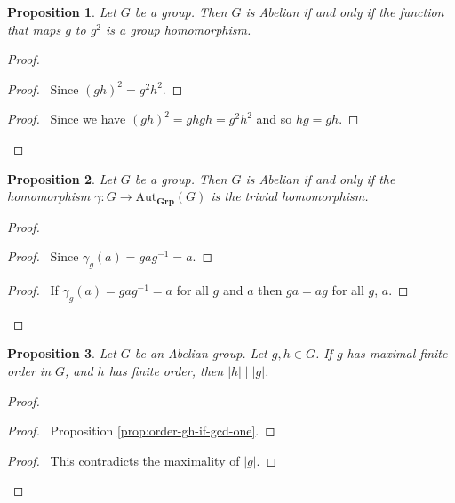 \documentclass{book}
\let\qed\relax
\newtheorem{prop}{Proposition}[chapter]
\theoremstyle{definition}
\newcommand{\Aut}[2]{\ensuremath{\mathrm{Aut}_{#1} \left( {#2} \right)}}
\newcommand{\Grp}{\ensuremath{\mathbf{Grp}}}
\newcommand{\inv}[1]{\ensuremath{{#1}^{-1}}}
\begin{document}
\begin{prop}
    Let $G$ be a group. Then $G$ is Abelian if and only if the function that maps $g$ to $g^2$ is a group homomorphism.
\end{prop}

\begin{proof}
    \pf
    \begin{proof}
        \pf\ Since $(gh)^2 = g^2h^2$.
    \end{proof}
    \begin{proof}
        \pf\ Since we have $(gh)^2 = ghgh = g^2 h^2$ and so $hg = gh$.
    \end{proof}
    \qed
\end{proof}

\begin{prop}
    Let $G$ be a group. Then $G$ is Abelian if and only if the homomorphism $\gamma : G \rightarrow \Aut{\Grp}{G}$ is the trivial homomorphism.
\end{prop}

\begin{proof}
    \pf
    \begin{proof}
        \pf\ Since $\gamma_g(a) = ga\inv{g} = a$.
    \end{proof}
    \begin{proof}
        \pf\ If $\gamma_g(a) = ga\inv{g} = a$ for all $g$ and $a$ then $ga = ag$ for all $g$, $a$.
    \end{proof}
    \qed
\end{proof}

\begin{prop}
    \label{prop:maximal-finite-order}
    Let $G$ be an Abelian group. Let $g,h \in G$. If $g$ has maximal finite order in $G$, and $h$ has finite order, then $|h| \mid |g|$.
\end{prop}

\begin{proof}
    \pf
    \begin{proof}
        \pf\ Proposition \ref{prop:order-gh-if-gcd-one}.
    \end{proof}
    \qedstep
    \begin{proof}
        \pf\ This contradicts the maximality of $|g|$.
    \end{proof}
    \qed
\end{proof}
\end{document}
